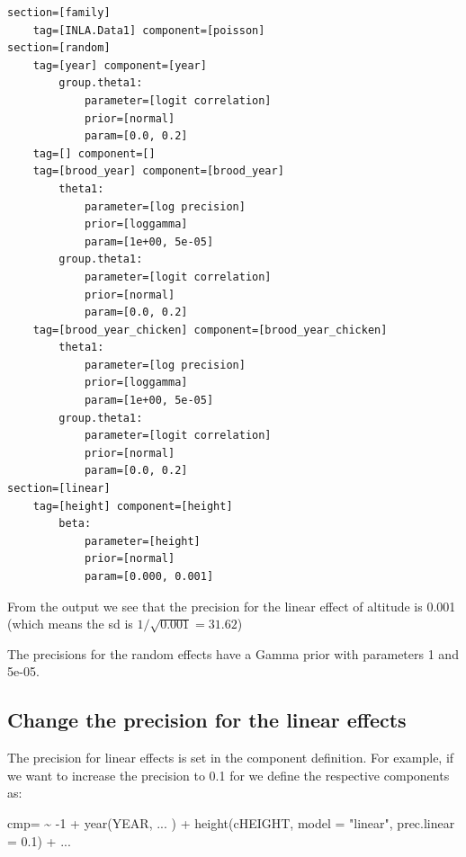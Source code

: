 \documentclass[
  letterpaper,
  DIV=11,
  numbers=noendperiod]{scrartcl}
\newenvironment{Shaded}{\begin{snugshade}}{\end{snugshade}}
\newcommand{\AttributeTok}[1]{\textcolor[rgb]{0.40,0.45,0.13}{#1}}
\newcommand{\DecValTok}[1]{\textcolor[rgb]{0.68,0.00,0.00}{#1}}
\newcommand{\ErrorTok}[1]{\textcolor[rgb]{0.68,0.00,0.00}{#1}}
\newcommand{\FloatTok}[1]{\textcolor[rgb]{0.68,0.00,0.00}{#1}}
\newcommand{\FunctionTok}[1]{\textcolor[rgb]{0.28,0.35,0.67}{#1}}
\newcommand{\NormalTok}[1]{\textcolor[rgb]{0.00,0.23,0.31}{#1}}
\newcommand{\OtherTok}[1]{\textcolor[rgb]{0.00,0.23,0.31}{#1}}
\newcommand{\SpecialCharTok}[1]{\textcolor[rgb]{0.37,0.37,0.37}{#1}}
\newcommand{\StringTok}[1]{\textcolor[rgb]{0.13,0.47,0.30}{#1}}
\begin{document}
\begin{verbatim}
section=[family]
    tag=[INLA.Data1] component=[poisson]
section=[random]
    tag=[year] component=[year]
        group.theta1:
            parameter=[logit correlation]
            prior=[normal]
            param=[0.0, 0.2]
    tag=[] component=[]
    tag=[brood_year] component=[brood_year]
        theta1:
            parameter=[log precision]
            prior=[loggamma]
            param=[1e+00, 5e-05]
        group.theta1:
            parameter=[logit correlation]
            prior=[normal]
            param=[0.0, 0.2]
    tag=[brood_year_chicken] component=[brood_year_chicken]
        theta1:
            parameter=[log precision]
            prior=[loggamma]
            param=[1e+00, 5e-05]
        group.theta1:
            parameter=[logit correlation]
            prior=[normal]
            param=[0.0, 0.2]
section=[linear]
    tag=[height] component=[height]
        beta:
            parameter=[height]
            prior=[normal]
            param=[0.000, 0.001]
\end{verbatim}

From the output we see that the precision for the linear effect of
altitude is 0.001 (which means the sd is \(1/\sqrt{0.001} = 31.62\))

The precisions for the random effects have a Gamma prior with parameters
1 and 5e-05.

\subsection{Change the precision for the linear
effects}\label{change-the-precision-for-the-linear-effects}

The precision for linear effects is set in the component definition. For
example, if we want to increase the precision to 0.1 for we define the
respective components as:

\begin{Shaded}
\begin{Highlighting}[]
\NormalTok{cmp}\OtherTok{=} \ErrorTok{\textasciitilde{}} \SpecialCharTok{{-}}\DecValTok{1} \SpecialCharTok{+} \FunctionTok{year}\NormalTok{(YEAR, ... ) }\SpecialCharTok{+}
  \FunctionTok{height}\NormalTok{(cHEIGHT, }\AttributeTok{model =}  \StringTok{"linear"}\NormalTok{, }\AttributeTok{prec.linear =} \FloatTok{0.1}\NormalTok{) }\SpecialCharTok{+}\NormalTok{ ...}
\end{Highlighting}
\end{Shaded}
\end{document}
